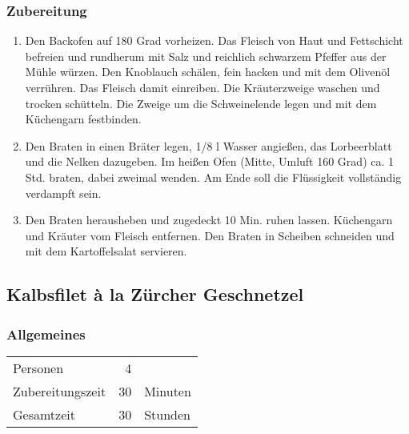 \subsubsection*{Zubereitung}
\begin{enumerate}
	\item Den Backofen auf 180 Grad vorheizen. Das Fleisch von Haut und Fettschicht befreien und rundherum mit Salz und reichlich schwarzem Pfeffer aus der Mühle würzen. Den Knoblauch schälen, fein hacken und mit dem Olivenöl verrühren. Das Fleisch damit einreiben. Die Kräuterzweige waschen und trocken schütteln. Die Zweige um die Schweinelende legen und mit dem Küchengarn festbinden. 
	\item Den Braten in einen Bräter legen, 1/8 l Wasser angießen, das Lorbeerblatt und die Nelken dazugeben. Im heißen Ofen (Mitte, Umluft 160 Grad) ca. 1 Std. braten, dabei zweimal wenden. Am Ende soll die Flüssigkeit vollständig verdampft sein. 
	\item Den Braten herausheben und zugedeckt 10 Min. ruhen lassen. Küchengarn und Kräuter vom Fleisch entfernen. Den Braten in Scheiben schneiden und mit dem Kartoffelsalat servieren. 
\end{enumerate}

\subsection{Kalbsfilet à la Zürcher Geschnetzel}
\subsubsection*{Allgemeines}
\begin{tabular}{lrl}
	Personen         &  4 &  \\
	Zubereitungszeit & 30 & Minuten \\
	Gesamtzeit       & 30 & Stunden \\
\end{tabular} 

